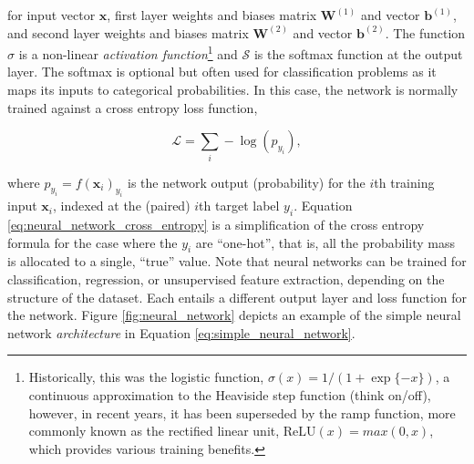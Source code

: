 for input vector $\mathbf{x}$, first layer weights and biases matrix $\mathbf{W}^{(1)}$ and vector $\mathbf{b}^{(1)}$, and second layer weights and biases matrix $\mathbf{W}^{(2)}$ and vector $\mathbf{b}^{(2)}$. The function $\sigma$ is a non-linear \emph{activation function}\footnote{Historically, this was the logistic function, $\sigma(x) = 1 / (1 + \exp{\{-x\}})$, a continuous approximation to the Heaviside step function (think on/off), however, in recent years, it has been superseded by the ramp function, more commonly known as the rectified linear unit, $\text{ReLU}(x) = max(0, x)$, which provides various training benefits.} and $\mathcal{S}$ is the softmax function at the output layer. The softmax is optional but often used for classification problems as it maps its inputs to categorical probabilities. In this case, the network is normally trained against a cross entropy loss function,

\begin{equation}
\mathcal{L} = \sum_i -\log(p_{y_i}),
\label{eq:neural_network_cross_entropy}
\end{equation}

where $p_{y_i} = f(\mathbf{x}_i)_{y_i}$ is the network output (probability) for the $i$th training input $\mathbf{x}_i$, indexed at the (paired) $i$th target label $y_i$. Equation \ref{eq:neural_network_cross_entropy} is a simplification of the cross entropy formula for the case where the $y_i$ are ``one-hot'', that is, all the probability mass is allocated to a single, ``true'' value. Note that neural networks can be trained for classification, regression, or unsupervised feature extraction, depending on the structure of the dataset. Each entails a different output layer and loss function for the network. Figure \ref{fig:neural_network} depicts an example of the simple neural network \emph{architecture} in Equation \ref{eq:simple_neural_network}.

